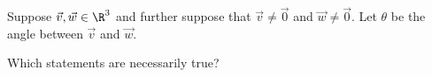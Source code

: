 \documentclass{ximera}
\author{Jim Talamo \and Jim Fowler}
\begin{document}
\begin{exercise}
  Suppose $\vec{v}, \vec{w} \in \R^3$ and further suppose that $\vec{v} \neq \vec{0}$ and $\vec{w} \neq \vec{0}$.  Let $\theta$ be the angle between $\vec{v}$ and $\vec{w}$.

  Which statements are necessarily true?
  \begin{selectAll}
  \end{selectAll}
\end{exercise}
\end{document}
